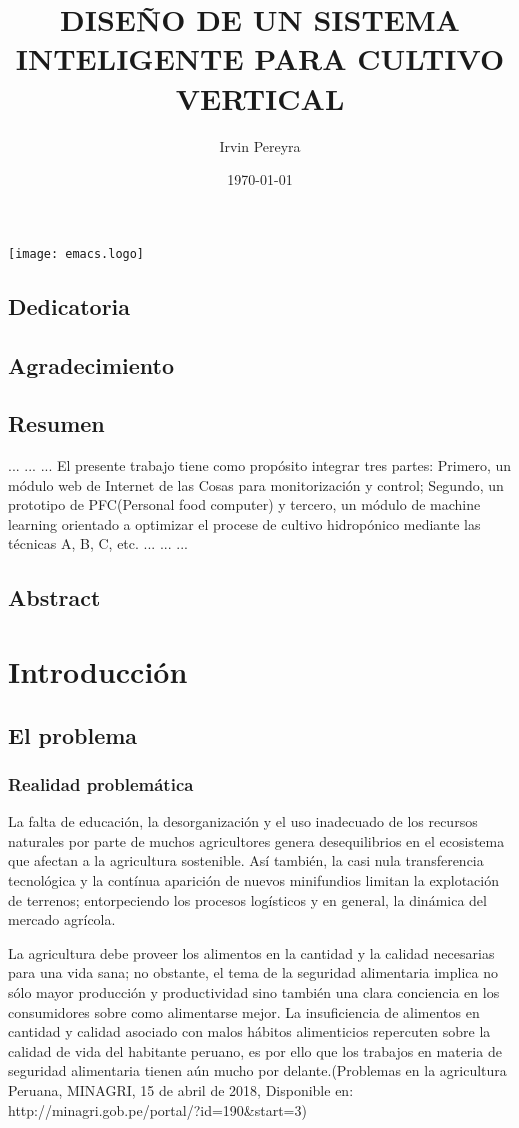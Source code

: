 \documentclass{report}
\title{DISEÑO DE UN SISTEMA INTELIGENTE PARA CULTIVO VERTICAL}
\author{Irvin Pereyra}
\date{\today}
\begin{document}
\maketitle
\texttt{[image: emacs.logo]}
\section{Dedicatoria}
\section{Agradecimiento}
\tableofcontents
\newpage
{}
\section{Resumen}
...
...
...
El presente trabajo tiene como propósito integrar tres partes: Primero, un
módulo web de Internet de las Cosas para monitorización y control; Segundo, un
prototipo de PFC(Personal food computer) y tercero, un módulo de machine
learning orientado a optimizar el procese de cultivo hidropónico mediante las
técnicas A, B, C, etc.
...
...
...
\section{Abstract}

\chapter{Introducción}
\section{El problema}
\subsection{Realidad problemática}

La falta de educación, la desorganización y el uso inadecuado de los recursos
naturales por parte de muchos agricultores genera desequilibrios en el
ecosistema que afectan a la agricultura sostenible. Así también, la casi nula
transferencia tecnológica y la contínua aparición de nuevos minifundios limitan
la explotación de terrenos; entorpeciendo los procesos logísticos y en general,
la dinámica del mercado agrícola.

La agricultura debe proveer los alimentos en la cantidad y la calidad necesarias
para una vida sana; no obstante, el tema de la seguridad alimentaria implica no
sólo mayor producción y productividad sino también una clara conciencia en los
consumidores sobre como alimentarse mejor. La insuficiencia de alimentos en
cantidad y calidad asociado con malos hábitos alimenticios repercuten sobre la
calidad de vida del habitante peruano, es por ello que los trabajos en materia
de seguridad alimentaria tienen aún mucho por delante.(Problemas en la
agricultura Peruana, MINAGRI, 15 de abril de 2018,  Disponible en:
http://minagri.gob.pe/portal/?id=190&start=3)
\end{document}
